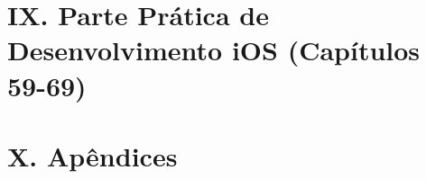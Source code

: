 \documentclass[11pt,a4paper,openany]{book}
\begin{document}
\part*{IX. Parte Prática de Desenvolvimento iOS (Capítulos 59-69)}











\appendix
\part*{X. Apêndices}









\end{document}
